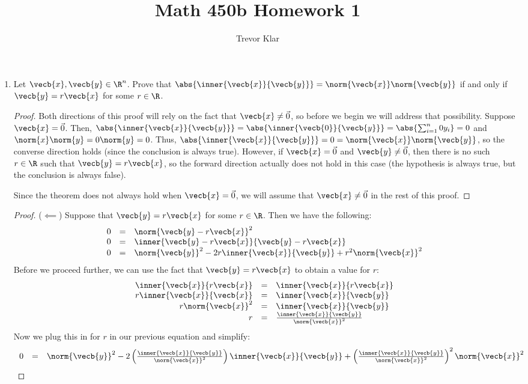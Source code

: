 \documentclass[letterpaper]{article}
\title{Math 450b \linebreak
Homework 1}
\author{Trevor Klar}
\begin{document}
\maketitle

\begin{enumerate}
\item Let $\vecb{x}, \vecb{y} \in \R^n$. Prove that $\abs{\inner{\vecb{x}}{\vecb{y}}}=\norm{\vecb{x}}\norm{\vecb{y}}$ if and only if $\vecb{y}=r\vecb{x}$ for some $r\in\R$. 
\begin{proof}
Both directions of this proof will rely on the fact that $\vecb{x}\neq\vec{0}$, so before we begin we will address that possibility. Suppose $\vecb{x} =\vec{0}$. Then, $\abs{\inner{\vecb{x}}{\vecb{y}}} = \abs{\inner{\vecb{0}}{\vecb{y}}} = \abs{\sum_{i=1}^n 0y_i} = 0$ and $\norm{x}\norm{y} = 0\norm{y} = 0$. Thus, $\abs{\inner{\vecb{x}}{\vecb{y}}}=0=\norm{\vecb{x}}\norm{\vecb{y}}$, so the converse direction holds (since the conclusion is always true). However, if $\vecb{x}=\vec{0}$ and $\vecb{y}\neq\vec{0}$, then there is no such $r\in\R$ such that $\vecb{y}=r\vecb{x}$, so the forward direction actually does not hold in this case (the hypothesis is always true, but the conclusion is always false). 

Since the theorem does not always hold when $\vecb{x}=\vec{0}$, we will assume that $\vecb{x}\neq\vec{0}$ in the rest of this proof. 
\end{proof}

\begin{proof}($\impliedby$) Suppose that $\vecb{y}=r\vecb{x}$ for some $r\in\R$. Then we have the following:
\[\begin{array}{rcl}
0&=&\norm{\vecb{y}-r\vecb{x}}^2\\
0&=&\inner{\vecb{y}-r\vecb{x}}{\vecb{y}-r\vecb{x}}\\
0&=&\norm{\vecb{y}}^2-2r\inner{\vecb{x}}{\vecb{y}}+r^2\norm{\vecb{x}}^2\\
\end{array}\]
Before we proceed further, we can use the fact that $\vecb{y}=r\vecb{x}$ to obtain a value for $r$:
\[\begin{array}{rcl}
\inner{\vecb{x}}{r\vecb{x}}&=&\inner{\vecb{x}}{r\vecb{x}}\\
r\inner{\vecb{x}}{\vecb{x}}&=&\inner{\vecb{x}}{\vecb{y}}\\
r\norm{\vecb{x}}^2&=&\inner{\vecb{x}}{\vecb{y}}\\
r&=&\frac{\inner{\vecb{x}}{\vecb{y}}}{\norm{\vecb{x}}^2}\\
\end{array}\]
Now we plug this in for $r$ in our previous equation and simplify:
\[\begin{array}{rcl}
0&=&\norm{\vecb{y}}^2
-2\left(\frac{\inner{\vecb{x}}{\vecb{y}}}{\norm{\vecb{x}}^2}\right)\inner{\vecb{x}}{\vecb{y}}
+\left(\frac{\inner{\vecb{x}}{\vecb{y}}}{\norm{\vecb{x}}^2}\right)^2\norm{\vecb{x}}^2\\


\end{array}\]
\end{proof}
\end{enumerate}
\end{document}
